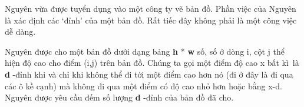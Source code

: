 Nguyên vừa được tuyển dụng vào một công ty vẽ bản đồ. Phần việc của Nguyên là xác định các ‘đỉnh’ của một bản đồ. Rất tiếc đây không phải là một công việc dễ dàng.  

   Nguyên được cho một bản đồ dưới dạng bảng   \textbf{    h   }   *   \textbf{    w   }   số, số ở dòng i, cột j thể hiện độ cao cho điểm (i,j) trên bản đồ. Chúng ta gọi một điểm độ cao x bất kì là   \textbf{    d   }   -đỉnh khi và chỉ khi không thể đi tới một điểm cao hơn nó (đi ở đây là đi qua các ô kề cạnh) mà không đi qua một điểm có độ cao nhỏ hơn hoặc bằng x-d. Nguyên được yêu cầu đếm số lượng   \textbf{    d   }   -đỉnh của bản đồ đã cho.